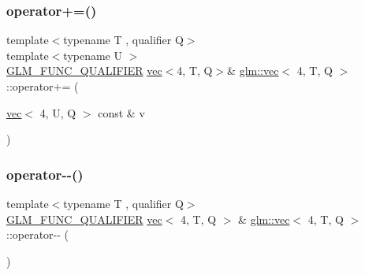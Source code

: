 \subsubsection{\texorpdfstring{operator+=()}{operator+=()}\hspace{0.1cm}{\footnotesize\ttfamily [6/6]}}
{\footnotesize\ttfamily template$<$typename T , qualifier Q$>$ \\
template$<$typename U $>$ \\
\mbox{\hyperlink{setup_8hpp_a33fdea6f91c5f834105f7415e2a64407}{G\+L\+M\+\_\+\+F\+U\+N\+C\+\_\+\+Q\+U\+A\+L\+I\+F\+I\+ER}} \mbox{\hyperlink{structglm_1_1vec}{vec}}$<$4, T, Q$>$\& \mbox{\hyperlink{structglm_1_1vec}{glm\+::vec}}$<$ 4, T, Q $>$\+::operator+= (\begin{DoxyParamCaption}\item[{\mbox{\hyperlink{structglm_1_1vec}{vec}}$<$ 4, U, Q $>$ const \&}]{v }\end{DoxyParamCaption})}

\mbox{\label{structglm_1_1vec_3_014_00_01_t_00_01_q_01_4_a1aa18c4fcac90cabb4f8cb2e467d4d9f}} 
\subsubsection{\texorpdfstring{operator-\/-\/()}{operator--()}\hspace{0.1cm}{\footnotesize\ttfamily [1/2]}}
{\footnotesize\ttfamily template$<$typename T , qualifier Q$>$ \\
\mbox{\hyperlink{setup_8hpp_a33fdea6f91c5f834105f7415e2a64407}{G\+L\+M\+\_\+\+F\+U\+N\+C\+\_\+\+Q\+U\+A\+L\+I\+F\+I\+ER}} \mbox{\hyperlink{structglm_1_1vec}{vec}}$<$ 4, T, Q $>$ \& \mbox{\hyperlink{structglm_1_1vec}{glm\+::vec}}$<$ 4, T, Q $>$\+::operator-\/-\/ (\begin{DoxyParamCaption}{ }\end{DoxyParamCaption})}

\mbox{\label{structglm_1_1vec_3_014_00_01_t_00_01_q_01_4_ae095dbcd5c299033774aef2f534e9a26}} 
